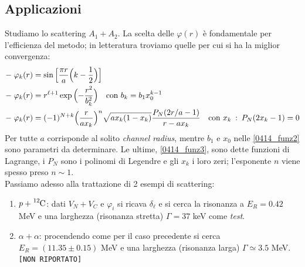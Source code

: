 \subsection{Applicazioni}
Studiamo lo scattering $A_1+A_2$. La scelta delle $\varphi (r)$ è fondamentale per l'efficienza del metodo; in letteratura troviamo quelle per cui si ha la miglior convergenza:
\begin{align}
	-\;&\varphi_k (r) = \sin{\pp{[}{\frac{\pi r}{a}\ppc{k-\frac{1}{2}}}{]}}%
	\label{0414_funz1} \\
	-\;&\varphi_k (r) = r^{\ell+1} \exp{\ppc{-\frac{r^2}{b^2_k}}}\quad \text{con } b_k = b_1 x_0^{k-1}%
	\label{0414_funz2} \\
	-\;&\varphi_k (r) = (-1)^{N+k} \ppc{\frac{r}{ax_k}}^n \sqrt{a x_k (1-x_k)} \frac{P_N(2r/a - 1)}{r-ax_k} \quad \text{con } x_k \: : \: P_N(2x_k - 1) = 0 %
	\label{0414_funz3}
\end{align}
Per tutte $a$ corrisponde al solito \textit{channel radius}, mentre $b_1$ e $x_0$ nelle \eqref{0414_funz2} sono parametri da determinare.
Le ultime, \eqref{0414_funz3}, sono dette funzioni di Lagrange, i $P_N$ sono i polinomi di Legendre e gli $x_k$ i loro zeri; l'esponente $n$ viene spesso preso $n\sim 1$.\\
Passiamo adesso alla trattazione di 2 esempi di scattering:
\begin{enumerate}
	\item $p+\ce{^{12}C}$: dati $V_N+V_C$ e $\varphi_i$ si ricava $\delta_\ell$ e si cerca la risonanza a $E_R = 0.42$ MeV e una larghezza (risonanza stretta) $\Gamma=37$ keV come \textit{test}.
	\item $\alpha + \alpha$: procendendo come per il caso precedente si cerca $E_R= (11.35 \pm 0.15)$ MeV e una larghezza (risonanza larga) $\Gamma\simeq 3.5$ MeV.\\
	\texttt{[NON RIPORTATO]}  
\end{enumerate}

